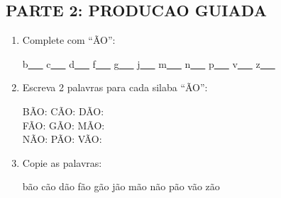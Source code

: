 \begin{exercicio}
\subsection*{PARTE 2: PRODUCAO GUIADA}

\begin{enumerate}[resume]
  \item Complete com ``ÃO'':
  \begin{center}
  b\underline{~~~} \quad c\underline{~~~} \quad d\underline{~~~} \quad f\underline{~~~} \quad g\underline{~~~} \quad j\underline{~~~} \quad m\underline{~~~} \quad n\underline{~~~} \quad p\underline{~~~} \quad v\underline{~~~} \quad z\underline{~~~}
  \end{center}

  \item Escreva 2 palavras para cada silaba ``ÃO'':
  \begin{center}
  BÃO: \underline{\hspace{3cm}} \underline{\hspace{3cm}} \quad CÃO: \underline{\hspace{3cm}} \underline{\hspace{3cm}} \quad DÃO: \underline{\hspace{3cm}} \underline{\hspace{3cm}} \\
  FÃO: \underline{\hspace{3cm}} \underline{\hspace{3cm}} \quad GÃO: \underline{\hspace{3cm}} \underline{\hspace{3cm}} \quad MÃO: \underline{\hspace{3cm}} \underline{\hspace{3cm}} \\
  NÃO: \underline{\hspace{3cm}} \underline{\hspace{3cm}} \quad PÃO: \underline{\hspace{3cm}} \underline{\hspace{3cm}} \quad VÃO: \underline{\hspace{3cm}} \underline{\hspace{3cm}}
  \end{center}

  \item Copie as palavras:
  \begin{center}
  bão \quad cão \quad dão \quad fão \quad gão \quad jão \quad mão \quad não \quad pão \quad vão \quad zão
  \end{center}


\end{enumerate}
\end{exercicio}
